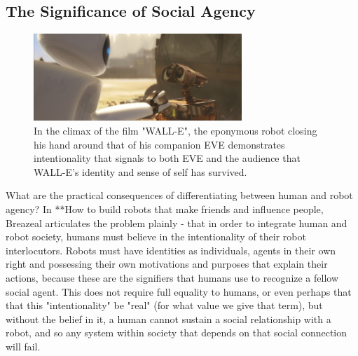 \documentclass{sfuthesis}
\begin{document}
\subsection{The Significance of Social Agency}

\begin{figure}[!b]
    \centering
    \includegraphics[width=0.7\textwidth]{walle.jpg} 

    \caption{In the climax of the film "WALL-E", the eponymous robot closing his hand around that of his companion EVE demonstrates intentionality that signals to both EVE and the audience that WALL-E's identity and sense of self has survived.}
    \label{fig:walle}
\end{figure}

What are the practical consequences of differentiating between human and robot agency? In **How to build robots that make friends and influence people, Breazeal articulates the problem plainly - that in order to integrate human and robot society, humans must believe in the intentionality of their robot interlocutors. Robots must have identities as individuals, agents in their own right and possessing their own motivations and purposes that explain their actions, because these are the signifiers that humans use to recognize a fellow social agent. This does not require full equality to humans, or even perhaps that that this "intentionality" be "real" (for what value we give that term), but without the belief in it, a human cannot sustain a social relationship with a robot, and so any system within society that depends on that social connection will fail.

\end{document}
